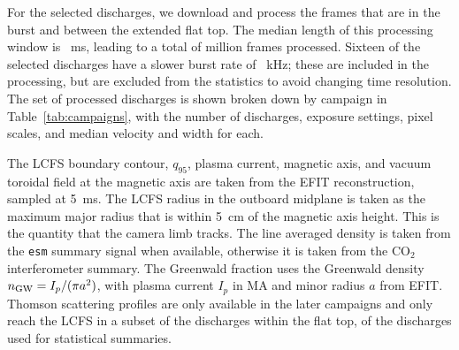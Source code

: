 For the \nShotsFetched{} selected discharges, we download and process the frames that are in the burst and between the extended flat top. The median length of this processing window is \windowMedianMs{}~ms, leading to a total of \nFramesProcessedM{} million frames processed. Sixteen of the selected discharges have a slower burst rate of \slowFpsKhz{}~kHz; these are included in the processing, but are excluded from the statistics to avoid changing time resolution. The set of processed discharges is shown broken down by campaign in Table~\ref{tab:campaigns}, with the number of discharges, exposure settings, pixel scales, and median velocity and width for each.

\begin{table}[t]
\centering
\scriptsize

\caption{Processed discharges, broken down by campaign, and within these by exposure setting. The ``In stats'' column shows only those discharges with at least 50 selected tracks. The ``pooled'' and ``own'' columns are the calibrations' scales presented in Section~\ref{sec:calibration}, with their 95\% bootstrap intervals. The columns $\tilde v_r$ and $\tilde\delta_r$ are the median over discharges of each discharge's per-discharge median velocity and width.}
\label{tab:campaigns}
\end{table}

The LCFS boundary contour, $q_{95}$, plasma current, magnetic axis, and vacuum toroidal field at the magnetic axis are taken from the EFIT reconstruction, sampled at 5~ms. The LCFS radius in the outboard midplane is taken as the maximum major radius that is within 5~cm of the magnetic axis height. This is the quantity that the camera limb tracks. The line averaged density is taken from the \texttt{esm} summary signal when available, otherwise it is taken from the CO$_2$ interferometer summary. The Greenwald fraction uses the Greenwald density $n_{\rm GW} = I_p/(\pi a^2)$, with plasma current $I_p$ in MA and minor radius $a$ from EFIT. Thomson scattering profiles are only available in the later campaigns and only reach the LCFS in a subset of the discharges within the flat top, \nTeMeasured{} of the \nShotsStats{} discharges used for statistical summaries.

